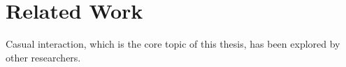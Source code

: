 \chapter{Related Work}
Casual interaction, which is the core topic of this thesis, has been explored by other researchers. %
